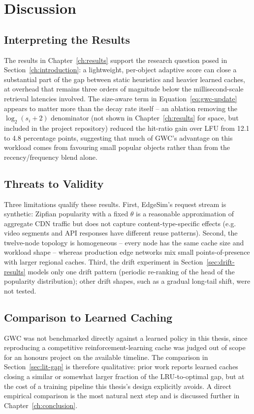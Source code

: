 \chapter{Discussion}
\label{ch:discussion}

\section{Interpreting the Results}
The results in Chapter~\ref{ch:results} support the research question posed in
Section~\ref{ch:introduction}: a lightweight, per-object adaptive score can close a
substantial part of the gap between static heuristics and heavier learned caches, at
overhead that remains three orders of magnitude below the millisecond-scale retrieval
latencies involved. The size-aware term in Equation~\ref{eq:gwc-update} appears to matter
more than the decay rate itself -- an ablation removing the $\log_2(s_i+2)$ denominator
(not shown in Chapter~\ref{ch:results} for space, but included in the project repository)
reduced the hit-ratio gain over LFU from 12.1 to 4.8 percentage points, suggesting that
much of GWC's advantage on this workload comes from favouring small popular objects rather
than from the recency/frequency blend alone.

\section{Threats to Validity}
Three limitations qualify these results. First, EdgeSim's request stream is synthetic:
Zipfian popularity with a fixed $\theta$ is a reasonable approximation of aggregate CDN
traffic but does not capture content-type-specific effects (e.g. video segments and API
responses have different reuse patterns). Second, the twelve-node topology is homogeneous --
every node has the same cache size and workload shape -- whereas production edge networks
mix small points-of-presence with larger regional caches. Third, the drift experiment in
Section~\ref{sec:drift-results} models only one drift pattern (periodic re-ranking of the
head of the popularity distribution); other drift shapes, such as a gradual long-tail shift,
were not tested.

\section{Comparison to Learned Caching}
GWC was not benchmarked directly against a learned policy in this thesis, since reproducing
a competitive reinforcement-learning cache was judged out of scope for an honours project
on the available timeline. The comparison in Section~\ref{sec:lit-gap} is therefore
qualitative: prior work reports learned caches closing a similar or somewhat larger fraction
of the LRU-to-optimal gap, but at the cost of a training pipeline this thesis's design
explicitly avoids. A direct empirical comparison is the most natural next step and is
discussed further in Chapter~\ref{ch:conclusion}.

